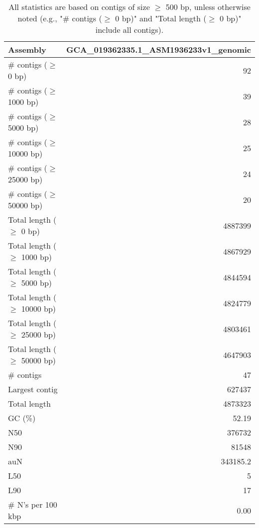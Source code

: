 \documentclass[12pt,a4paper]{article}
\begin{document}
\begin{table}[ht]
\begin{center}
\caption{All statistics are based on contigs of size $\geq$ 500 bp, unless otherwise noted (e.g., "\# contigs ($\geq$ 0 bp)" and "Total length ($\geq$ 0 bp)" include all contigs).}
\begin{tabular}{|l*{1}{|r}|}
\hline
Assembly & GCA\_019362335.1\_ASM1936233v1\_genomic \\ \hline
\# contigs ($\geq$ 0 bp) & 92 \\ \hline
\# contigs ($\geq$ 1000 bp) & 39 \\ \hline
\# contigs ($\geq$ 5000 bp) & 28 \\ \hline
\# contigs ($\geq$ 10000 bp) & 25 \\ \hline
\# contigs ($\geq$ 25000 bp) & 24 \\ \hline
\# contigs ($\geq$ 50000 bp) & 20 \\ \hline
Total length ($\geq$ 0 bp) & 4887399 \\ \hline
Total length ($\geq$ 1000 bp) & 4867929 \\ \hline
Total length ($\geq$ 5000 bp) & 4844594 \\ \hline
Total length ($\geq$ 10000 bp) & 4824779 \\ \hline
Total length ($\geq$ 25000 bp) & 4803461 \\ \hline
Total length ($\geq$ 50000 bp) & 4647903 \\ \hline
\# contigs & 47 \\ \hline
Largest contig & 627437 \\ \hline
Total length & 4873323 \\ \hline
GC (\%) & 52.19 \\ \hline
N50 & 376732 \\ \hline
N90 & 81548 \\ \hline
auN & 343185.2 \\ \hline
L50 & 5 \\ \hline
L90 & 17 \\ \hline
\# N's per 100 kbp & 0.00 \\ \hline
\end{tabular}
\end{center}
\end{table}
\end{document}
